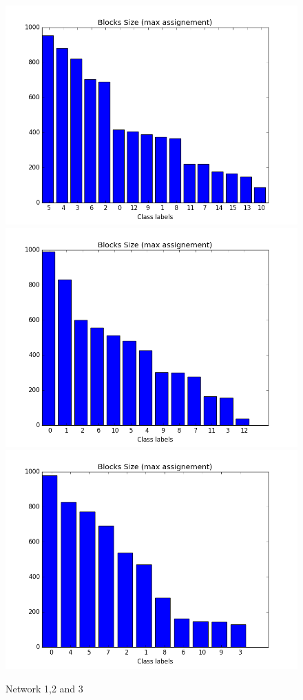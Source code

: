 \begin{figure}[ht]
	\endminipage
		\vspace{-0.28cm}
	\includegraphics[scale=0.27]{img/expe/1_ibp/figure_3}
	\endminipage
	\includegraphics[scale=0.27]{img/expe/2_ibp/figure_3} 
	\endminipage
	\includegraphics[scale=0.27]{img/expe/3_ibp/figure_3}
	\endminipage
    \caption{Network 1,2 and 3}

\end{figure}


